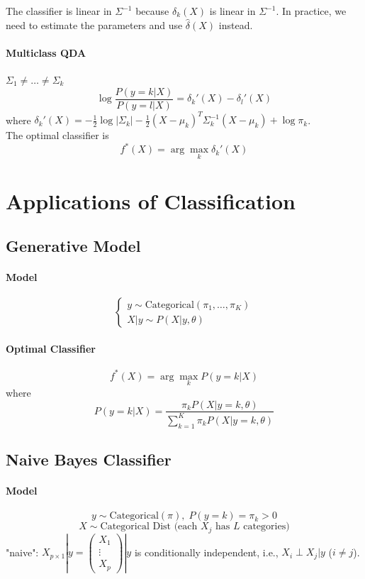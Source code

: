 \documentclass[12pt]{book}
\theoremstyle{definition}
\theoremstyle{remark}
\begin{document}
The classifier is linear in $\Sigma^{-1}$ because $\delta_k(X)$ is linear in $\Sigma^{-1}$. In practice, we need to estimate the parameters and use $\hat{\delta}(X)$ instead. 
\paragraph{Multiclass QDA}
$\Sigma_1 \ne \dots \ne \Sigma_k$\\
\[\log \frac{P(y = k|X)}{P(y = l|X)} = \delta_k'(X) - \delta_l'(X) \]
where $\delta_k'(X) = -\frac12\log|\Sigma_k| - \frac12(X-\mu_k)^T\Sigma_k^{-1}(X-\mu_k)+\log\pi_k$.\\
The optimal classifier is \[f^*(X) = \arg\underset{k}{\max}\delta_k'(X)\]



\newpage
\section{Applications of Classification}
\subsection{Generative Model}
\paragraph{Model}
\[\begin{cases} y \sim \text{Categorical}(\pi_1, \dots, \pi_K)
 \\X|y \sim P(X|y,\theta)
\end{cases}\]
\paragraph{Optimal Classifier}
\[f^*(X) = \arg\underset{k}{\max}P(y=k|X)\]
where \[P(y=k|X) = \frac{\pi_k P(X|y=k,\theta)}{\sum_{k=1}^K\pi_kP(X|y=k,\theta)}\]


\subsection{Naive Bayes Classifier}
\paragraph{Model}
\[y \sim \text{Categorical}(\pi), \;P(y = k) = \pi_k>0\]
\[X \sim \text{Categorical Dist (each $X_j$ has $L$ categories)}\]
"naive": $X_{p\times 1}|y = \begin{pmatrix}X_1
 \\\vdots
 \\X_p
\end{pmatrix}|y$ is conditionally independent, i.e., $X_i\perp X_j|y$ ($i\ne j$).
\end{document}

